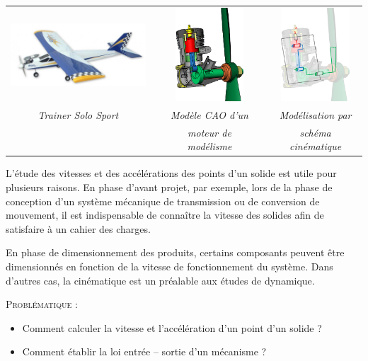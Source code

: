 \documentclass[11pt,oneside]{article}
\begin{document}
\begin{center}
\begin{tabular}{ccccc}
\includegraphics[height=2.5cm]{png/avion} &&
\includegraphics[height=3.5cm]{png/moteur_3d} && 
\includegraphics[height=3.5cm]{png/moteur_3d_sch}\\
\textit{Trainer Solo Sport \cite{cite1}} &&
\textit{Modèle CAO d'un} &&
\textit{Modélisation par}\\
 &&
\textit{moteur de modélisme \cite{cite2}} &&
\textit{schéma cinématique}\\
\end{tabular}
\end{center}

\vspace{.2cm}
L'étude des vitesses et des accélérations des points d'un solide est utile pour plusieurs raisons. En phase d'avant projet, par exemple, lors de la phase de conception d'un système mécanique de transmission ou de conversion de mouvement, il est indispensable de connaître la vitesse des solides afin de satisfaire à un cahier des charges.

En phase de dimensionnement des produits, certains composants peuvent être dimensionnés en fonction de la vitesse de fonctionnement du système. Dans d'autres cas, la cinématique est un préalable aux études de dynamique. 

\begin{prob}
\textsc{Problématique :}
\begin{itemize}
\item Comment calculer la vitesse et l'accélération d'un point d'un solide ?
\item Comment établir la loi entrée -- sortie d'un mécanisme ?
\end{itemize}
\end{prob}
\end{document}
